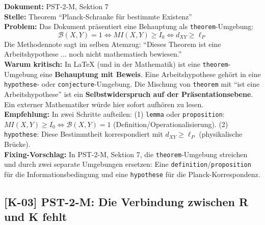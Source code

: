 \documentclass[11pt,a4paper]{article}
\newcommand{\K}[1]{\textbf{[K-#1]}}
\newcommand{\Dok}[1]{\textbf{Dokument:} #1\\}
\newcommand{\Stelle}[1]{\textbf{Stelle:} #1\\}
\newcommand{\Prob}[1]{\textbf{Problem:} #1\\}
\newcommand{\Krit}[1]{\textbf{Warum kritisch:} #1\\}
\newcommand{\Empf}[1]{\textbf{Empfehlung:} #1\\}
\newcommand{\Fix}[1]{\textbf{Fixing-Vorschlag:} #1\\}
\begin{document}
\Dok{PST-2-M, Sektion 7}
\Stelle{Theorem ``Planck-Schranke f\"{u}r bestimmte Existenz''}
\Prob{Das Dokument pr\"{a}sentiert eine Behauptung als
\texttt{theorem}-Umgebung:
\[
  \mathcal{B}(X,Y) = 1 \iff MI(X,Y) \geq I_0 \iff d_{XY} \geq \ell_P
\]
Die Methodennote sagt im selben Atemzug: ``Dieses Theorem ist eine
Arbeitshypothese ... noch nicht mathematisch bewiesen.''}
\Krit{In LaTeX (und in der Mathematik) ist eine \texttt{theorem}-Umgebung
eine \textbf{Behauptung mit Beweis}. Eine Arbeitshypothese geh\"{o}rt in
eine \texttt{hypothese}- oder \texttt{conjecture}-Umgebung. Die Mischung
von \texttt{theorem} mit ``ist eine Arbeitshypothese'' ist ein
\textbf{Selbstwiderspruch auf der Pr\"{a}sentationsebene}. Ein externer
Mathematiker w\"{u}rde hier sofort aufh\"{o}ren zu lesen.}
\Empf{In zwei Schritte aufteilen: (1) \texttt{lemma} oder
\texttt{proposition}: $MI(X,Y) \geq I_0 \iff \mathcal{B}(X,Y) = 1$
(Definition/Operationalisierung). (2) \texttt{hypothese}: Diese
Bestimmtheit korrespondiert mit $d_{XY} \geq \ell_P$
(physikalische Br\"{u}cke).}
\Fix{In PST-2-M, Sektion 7, die \texttt{theorem}-Umgebung streichen und
durch zwei separate Umgebungen ersetzen: Eine
\texttt{definition}/\texttt{proposition} f\"{u}r die
Informationsbedingung und eine \texttt{hypothese} f\"{u}r die
Planck-Korrespondenz.}

\subsection{\K{03} PST-2-M: Die Verbindung zwischen \textbf{R} und \textbf{K} fehlt}
\end{document}
